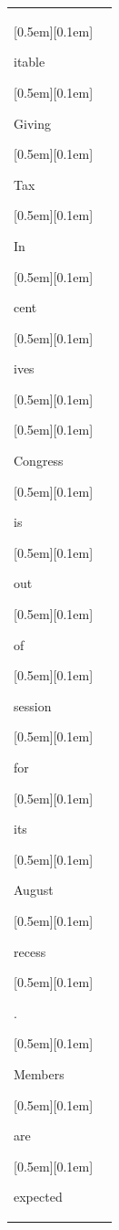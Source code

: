 \begin{table}[ht]
\begin{tabular}{@{}l p{13cm}@{}}
{\setlength{\fboxsep}{1pt}\raisebox{0pt}[0.5em][0.1em]{\colorbox{Salmon!60}{\strut{itable}}}}{\setlength{\fboxsep}{1pt}\raisebox{0pt}[0.5em][0.1em]{\colorbox{Salmon!60}{\strut{ Giving}}}}{\setlength{\fboxsep}{1pt}\raisebox{0pt}[0.5em][0.1em]{\colorbox{Salmon!60}{\strut{ Tax}}}}{\setlength{\fboxsep}{1pt}\raisebox{0pt}[0.5em][0.1em]{\colorbox{SkyBlue!55}{\strut{ In}}}}{\setlength{\fboxsep}{1pt}\raisebox{0pt}[0.5em][0.1em]{\colorbox{DarkOrchid!25}{\strut{cent}}}}{\setlength{\fboxsep}{1pt}\raisebox{0pt}[0.5em][0.1em]{\colorbox{SkyBlue!55}{\strut{ives}}}}{\setlength{\fboxsep}{1pt}\raisebox{0pt}[0.5em][0.1em]{\colorbox{DarkOrchid!25}{\strut{ }}}}{\setlength{\fboxsep}{1pt}\raisebox{0pt}[0.5em][0.1em]{\colorbox{DarkOrchid!25}{\strut{Congress}}}}{\setlength{\fboxsep}{1pt}\raisebox{0pt}[0.5em][0.1em]{\colorbox{SkyBlue!55}{\strut{ is}}}}{\setlength{\fboxsep}{1pt}\raisebox{0pt}[0.5em][0.1em]{\colorbox{Salmon!60}{\strut{ out}}}}{\setlength{\fboxsep}{1pt}\raisebox{0pt}[0.5em][0.1em]{\colorbox{SkyBlue!55}{\strut{ of}}}}{\setlength{\fboxsep}{1pt}\raisebox{0pt}[0.5em][0.1em]{\colorbox{SkyBlue!55}{\strut{ session}}}}{\setlength{\fboxsep}{1pt}\raisebox{0pt}[0.5em][0.1em]{\colorbox{SkyBlue!55}{\strut{ for}}}}{\setlength{\fboxsep}{1pt}\raisebox{0pt}[0.5em][0.1em]{\colorbox{SkyBlue!55}{\strut{ its}}}}{\setlength{\fboxsep}{1pt}\raisebox{0pt}[0.5em][0.1em]{\colorbox{Salmon!60}{\strut{ August}}}}{\setlength{\fboxsep}{1pt}\raisebox{0pt}[0.5em][0.1em]{\colorbox{Salmon!60}{\strut{ recess}}}}{\setlength{\fboxsep}{1pt}\raisebox{0pt}[0.5em][0.1em]{\colorbox{DarkOrchid!25}{\strut{.}}}}{\setlength{\fboxsep}{1pt}\raisebox{0pt}[0.5em][0.1em]{\colorbox{DarkOrchid!25}{\strut{ Members}}}}{\setlength{\fboxsep}{1pt}\raisebox{0pt}[0.5em][0.1em]{\colorbox{SkyBlue!55}{\strut{ are}}}}{\setlength{\fboxsep}{1pt}\raisebox{0pt}[0.5em][0.1em]{\colorbox{DarkOrchid!25}{\strut{ expected}}}}


\end{tabular}
\end{table}
